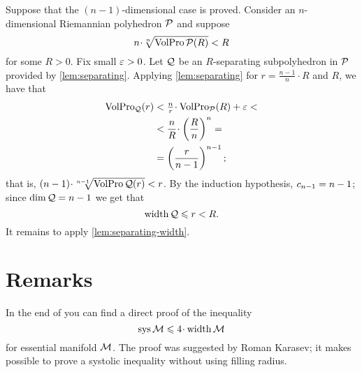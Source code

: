 Suppose that the  $(n-1)$-dimensional case is proved.
Consider an $n$-dimensional Riemannian polyhedron $\mathcal{P}$ and suppose
\[n\cdot \sqrt[n]{\VolPro\spc{P}(R)}< R\]
for some $R>0$.
Fix small $\varepsilon>0$.
Let $\mathcal{Q}$ be an $R$-separating subpolyhedron in $\mathcal{P}$ provided by \ref{lem:separating}.
Applying  \ref{lem:separating} for $r=\tfrac{n-1}n\cdot R$ and $R$, we have that 
\begin{align*}
\VolPro_\spc{Q}(r) &< \tfrac nr\cdot \VolPro_\spc{P}(R)+\eps<
\\
&<\frac {n}{R}\cdot\left(\frac{R}{n}\right)^n=
\\
&=\left(\frac{r}{n-1}\right)^{n-1};
\end{align*}
that is, $(n-1)\cdot \sqrt[n-1]{\VolPro\spc{Q}(r)}< r$.
By the induction hypothesis, $c_{n-1}\z=n-1$;
since $\operatorname{\rm dim}\nolimits\mathcal{Q}=n-1$ we get that
\[\operatorname{\rm width}\nolimits\mathcal{Q}\leqslant r<R.\]
It remains to apply \ref{lem:separating-width}.
\qeds

\section{Remarks}




In the end of \cite{nabutovsky} you can find a direct proof of the inequality 
\[\sys \spc{M}\le 4\cdot \width\spc{M}\]
for essential manifold $\mathcal{M}$.
The proof was suggested by Roman Karasev;
it makes possible to prove a systolic inequality without using filling radius.
